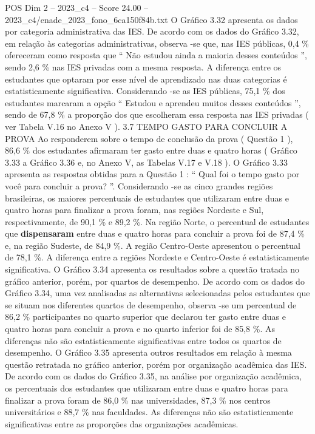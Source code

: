 \begin{textsample}{POS Dim 2 – 2023\_c4 – Score 24.00 – 2023\_c4/enade\_2023\_fono\_6ca150f84b.txt}
O Gráfico 3.32 apresenta os dados por categoria administrativa das IES.
De acordo com os dados do Gráfico 3.32, em relação às categorias administrativas, observa -se que, nas IES públicas, 0,4 \% ofereceram como resposta que “ Não estudou ainda a maioria desses conteúdos ”, sendo 2,6 \% nas IES privadas com a mesma resposta.
A diferença entre os estudantes que optaram por esse nível de aprendizado nas duas categorias é estatisticamente significativa.
Considerando -se as IES públicas, 75,1 \% dos estudantes marcaram a opção “ Estudou e aprendeu muitos desses conteúdos ”, sendo de 67,8 \% a proporção dos que escolheram essa resposta nas IES privadas ( ver Tabela V.16 no Anexo V ). 3.7 TEMPO GASTO PARA CONCLUIR A PROVA Ao responderem sobre o tempo de conclusão da prova ( Questão 1 ), 86,6 \% dos estudantes afirmaram ter gasto entre duas e quatro horas ( Gráfico 3.33 a Gráfico 3.36 e, no Anexo V, as Tabelas V.17 e V.18 ).
O Gráfico 3.33 apresenta as respostas obtidas para a Questão 1 : “ Qual foi o tempo gasto por você para concluir a prova? ”.
Considerando -se as cinco grandes regiões brasileiras, os maiores percentuais de estudantes que utilizaram entre duas e quatro horas para finalizar a prova foram, nas regiões Nordeste e Sul, respectivamente, de 90,1 \% e 89,2 \%.
Na região Norte, o percentual de estudantes que \textbf{dispensaram} entre duas e quatro horas para concluir a prova foi de 87,4 \% e, na região Sudeste, de 84,9 \%.
A região Centro-Oeste apresentou o percentual de 78,1 \%.
A diferença entre a regiões Nordeste e Centro-Oeste é estatisticamente significativa.
O Gráfico 3.34 apresenta os resultados sobre a questão tratada no gráfico anterior, porém, por quartos de desempenho.
De acordo com os dados do Gráfico 3.34, uma vez analisadas as alternativas selecionadas pelos estudantes que se situam nos diferentes quartos de desempenho, observa -se um percentual de 86,2 \% participantes no quarto superior que declarou ter gasto entre duas e quatro horas para concluir a prova e no quarto inferior foi de 85,8 \%.
As diferenças não são estatisticamente significativas entre todos os quartos de desempenho.
O Gráfico 3.35 apresenta outros resultados em relação à mesma questão retratada no gráfico anterior, porém por organização acadêmica das IES.
De acordo com os dados do Gráfico 3.35, na análise por organização acadêmica, os percentuais dos estudantes que utilizaram entre duas e quatro horas para finalizar a prova foram de 86,0 \% nas universidades, 87,3 \% nos centros universitários e 88,7 \% nas faculdades.
As diferenças não são estatisticamente significativas entre as proporções das organizações acadêmicas.

\end{textsample}
